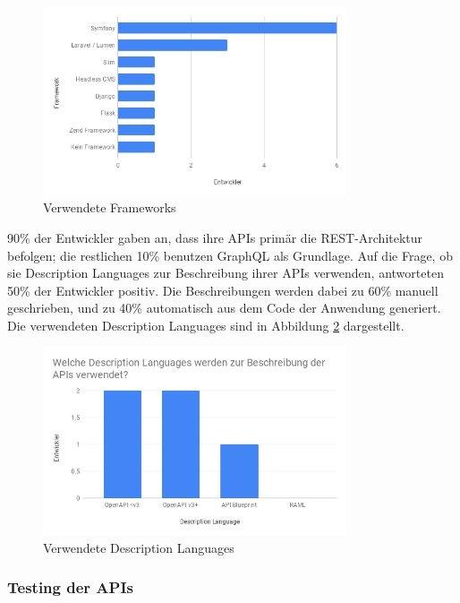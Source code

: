 \begin{figure}[H]
\centering
  \includegraphics[width=0.8\textwidth]{../images/frameworks.png}
  \caption{Verwendete Frameworks}
  \label{fig:sv-frameworks}
\end{figure}

90\% der Entwickler gaben an, dass ihre APIs primär die REST-Architektur befolgen; die restlichen 10\% benutzen GraphQL als Grundlage. Auf die Frage, ob sie Description Languages zur Beschreibung ihrer APIs verwenden, antworteten 50\% der Entwickler positiv. Die Beschreibungen werden dabei zu 60\% manuell geschrieben, und zu 40\% automatisch aus dem Code der Anwendung generiert. Die verwendeten Description Languages sind in Abbildung \ref{fig:sv-dls} dargestellt.

\begin{figure}[H]
\centering
  \includegraphics[width=0.8\textwidth]{../images/dl_type.png}
  \caption{Verwendete Description Languages}
  \label{fig:sv-dls}
\end{figure}

\subsubsection{Testing der APIs}

